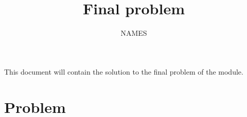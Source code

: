 \documentclass[11pt,reqno,oneside,a4paper]{article}
\title{Final problem}
\author{NAMES}
\begin{document}

\maketitle
\thispagestyle{fancy}

This document will contain the solution to the final problem of the module.

\tableofcontents

\clearpage
\section{Problem} \label{sec:problem}


% 
\end{document}
